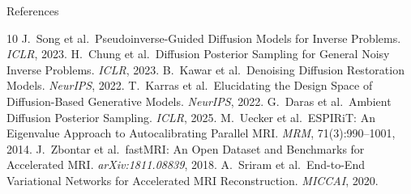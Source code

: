 \documentclass[aspectratio=169]{beamer}
\begin{document}
\begin{frame}[allowframebreaks]{References}
  \scriptsize
  \begin{thebibliography}{10}
      J.~Song et al.\ Pseudoinverse-Guided Diffusion Models for Inverse Problems. \emph{ICLR}, 2023.
      H.~Chung et al.\ Diffusion Posterior Sampling for General Noisy Inverse Problems. \emph{ICLR}, 2023.
      B.~Kawar et al.\ Denoising Diffusion Restoration Models. \emph{NeurIPS}, 2022.
      T.~Karras et al.\ Elucidating the Design Space of Diffusion-Based Generative Models. \emph{NeurIPS}, 2022.
      G.~Daras et al.\ Ambient Diffusion Posterior Sampling. \emph{ICLR}, 2025.
      M.~Uecker et al.\ ESPIRiT: An Eigenvalue Approach to Autocalibrating Parallel MRI. \emph{MRM}, 71(3):990--1001, 2014.
      J.~Zbontar et al.\ fastMRI: An Open Dataset and Benchmarks for Accelerated MRI. \emph{arXiv:1811.08839}, 2018.
      A.~Sriram et al.\ End-to-End Variational Networks for Accelerated MRI Reconstruction. \emph{MICCAI}, 2020.
  \end{thebibliography}
\end{frame}
\end{document}
